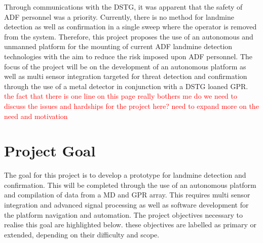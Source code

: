 \documentclass[main.tex]{subfiles}
\begin{document}
Through communications with the DSTG, it was apparent that the safety of ADF personnel  was a priority. Currently, there is no method for landmine detection as well as confirmation in a single sweep where the operator is removed from the system. Therefore, this project proposes the use of an autonomous and unmanned platform for the mounting of current ADF landmine detection technologies with the aim to reduce the risk imposed upon ADF personnel. The focus of the project will be on the development of an autonomous platform as well as multi sensor integration targeted for threat detection and confirmation through the use of a metal detector in conjunction with a DSTG loaned GPR.
\\



\textcolor{red}{the fact that there is one line on this page really bothers me}
\textcolor{red}{do we need to discuss the issues and hardships for the project here?}
\textcolor{red}{need to expand more on the need and motivation}
\\\par



\section{Project Goal}

The goal for this project is to develop a prototype for landmine detection and confirmation. This will be completed through the use of an autonomous platform and compilation of data from a MD and GPR array. This requires multi sensor integration and advanced signal processing as well as software development for the platform navigation and automation. The project objectives necessary to realise this goal are highlighted below. these objectives are labelled as primary or extended, depending on their difficulty and scope.
\end{document}
